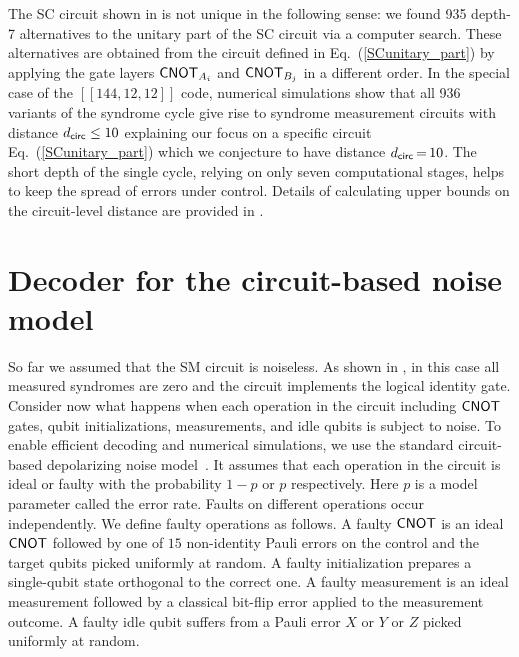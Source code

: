 \documentclass{article}
\begin{document}

The SC circuit shown in  is not unique in the following sense: we found 935 depth-7 alternatives to the unitary part of the SC circuit via a computer search. 
These alternatives are obtained from the circuit defined in  Eq.~(\ref{SCunitary_part}) by applying the gate layers $\mathsf{CNOT}_{A_i}$ and $\mathsf{CNOT}_{B_j}$ in a different order. 
In the special case of the $[[144,12,12]]$ code,
numerical simulations show that all 936 variants of the syndrome cycle give rise to syndrome measurement circuits with distance $d_{\mathsf{circ}}\le 10$ explaining our focus on a specific circuit Eq.~(\ref{SCunitary_part}) which we conjecture to have distance $d_{\mathsf{circ}}\,{=}\,10$.  The short depth of the single cycle, relying on only seven computational stages, helps to keep the spread of errors under control.  Details of calculating upper bounds on the circuit-level distance are provided in .




\section{Decoder for the circuit-based noise model}
\label{sec:decoder}


So far we assumed that  the SM circuit is noiseless.
As shown in ,
in this case all measured syndromes are zero and the circuit implements the logical identity gate.
Consider now what happens when each operation in the circuit including $\mathsf{CNOT}$ gates, qubit initializations,
measurements, and idle qubits is subject to noise. To enable efficient decoding and
numerical simulations, we use
the standard circuit-based depolarizing noise model~\cite{fowler2009high}.
It assumes that each operation in the circuit is  ideal or faulty with the
probability $1-p$ or $p$ respectively. Here $p$ is a model parameter
called the error rate. Faults on different operations occur independently.
We define faulty operations as follows.
A faulty $\mathsf{CNOT}$  is an ideal $\mathsf{CNOT}$
followed by one of $15$ non-identity Pauli errors on the control and the target qubits
 picked uniformly at random. A faulty initialization
prepares a single-qubit state orthogonal to the correct one.
A faulty measurement is an ideal measurement followed by a classical
bit-flip error applied to the measurement outcome.
A faulty idle  qubit suffers from a Pauli error
$X$ or $Y$ or $Z$ picked uniformly at random.
\end{document}
